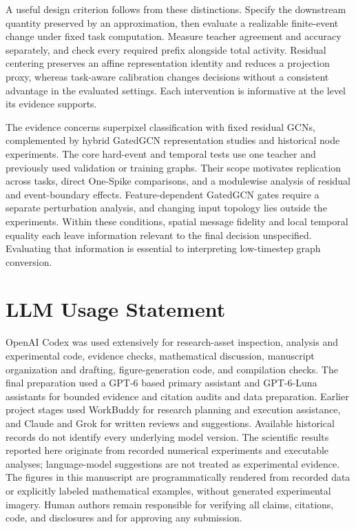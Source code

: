 \documentclass[10pt,twocolumn,letterpaper]{article}
\begin{document}
A useful design criterion follows from these distinctions. Specify the downstream quantity preserved by an approximation, then evaluate a realizable finite-event change under fixed task computation. Measure teacher agreement and accuracy separately, and check every required prefix alongside total activity. Residual centering preserves an affine representation identity and reduces a projection proxy, whereas task-aware calibration changes decisions without a consistent advantage in the evaluated settings. Each intervention is informative at the level its evidence supports.

The evidence concerns superpixel classification with fixed residual GCNs, complemented by hybrid GatedGCN representation studies and historical node experiments. The core hard-event and temporal tests use one teacher and previously used validation or training graphs. Their scope motivates replication across tasks, direct One-Spike comparisons, and a modulewise analysis of residual and event-boundary effects. Feature-dependent GatedGCN gates require a separate perturbation analysis, and changing input topology lies outside the experiments. Within these conditions, spatial message fidelity and local temporal equality each leave information relevant to the final decision unspecified. Evaluating that information is essential to interpreting low-timestep graph conversion.

\clearpage
\section*{LLM Usage Statement}
OpenAI Codex was used extensively for research-asset inspection, analysis and experimental code, evidence checks, mathematical discussion, manuscript organization and drafting, figure-generation code, and compilation checks. The final preparation used a GPT-6 based primary assistant and GPT-6-Luna assistants for bounded evidence and citation audits and data preparation. Earlier project stages used WorkBuddy for research planning and execution assistance, and Claude and Grok for written reviews and suggestions. Available historical records do not identify every underlying model version. The scientific results reported here originate from recorded numerical experiments and executable analyses; language-model suggestions are not treated as experimental evidence. The figures in this manuscript are programmatically rendered from recorded data or explicitly labeled mathematical examples, without generated experimental imagery. Human authors remain responsible for verifying all claims, citations, code, and disclosures and for approving any submission.

{\small

}
\end{document}
